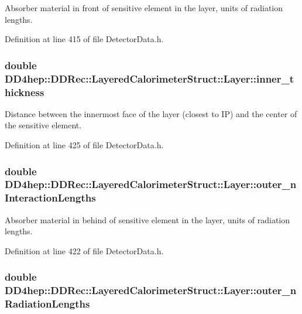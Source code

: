 Absorber material in front of sensitive element in the layer, units of radiation lengths. 

Definition at line 415 of file DetectorData.h.\hypertarget{struct_d_d4hep_1_1_d_d_rec_1_1_layered_calorimeter_struct_1_1_layer_a93e6705275f50921dbc1d816bcbd5f73}{
\subsubsection[{inner\_\-thickness}]{\setlength{\rightskip}{0pt plus 5cm}double {\bf DD4hep::DDRec::LayeredCalorimeterStruct::Layer::inner\_\-thickness}}}
\label{struct_d_d4hep_1_1_d_d_rec_1_1_layered_calorimeter_struct_1_1_layer_a93e6705275f50921dbc1d816bcbd5f73}


Distance between the innermost face of the layer (closest to IP) and the center of the sensitive element. 

Definition at line 425 of file DetectorData.h.\hypertarget{struct_d_d4hep_1_1_d_d_rec_1_1_layered_calorimeter_struct_1_1_layer_abf4dac9dd33fe0ac0eeb033bd0daa420}{
\subsubsection[{outer\_\-nInteractionLengths}]{\setlength{\rightskip}{0pt plus 5cm}double {\bf DD4hep::DDRec::LayeredCalorimeterStruct::Layer::outer\_\-nInteractionLengths}}}
\label{struct_d_d4hep_1_1_d_d_rec_1_1_layered_calorimeter_struct_1_1_layer_abf4dac9dd33fe0ac0eeb033bd0daa420}


Absorber material in behind of sensitive element in the layer, units of radiation lengths. 

Definition at line 422 of file DetectorData.h.\hypertarget{struct_d_d4hep_1_1_d_d_rec_1_1_layered_calorimeter_struct_1_1_layer_af46a77937ad8427edb903e291e5370fd}{
\subsubsection[{outer\_\-nRadiationLengths}]{\setlength{\rightskip}{0pt plus 5cm}double {\bf DD4hep::DDRec::LayeredCalorimeterStruct::Layer::outer\_\-nRadiationLengths}}}
\label{struct_d_d4hep_1_1_d_d_rec_1_1_layered_calorimeter_struct_1_1_layer_af46a77937ad8427edb903e291e5370fd}



